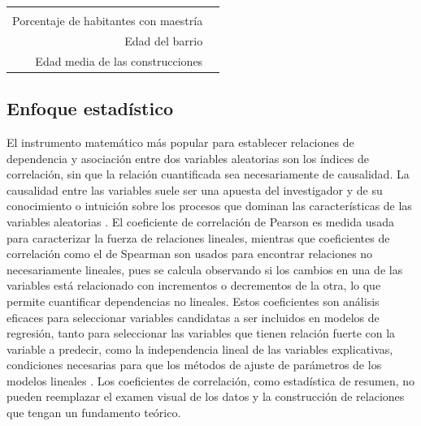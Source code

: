 \documentclass[12pt,]{book}
\begin{document}
\begin{longtable}[]{@{}rr@{}}
\begin{minipage}[t]{0.31\columnwidth}
\end{minipage}\tabularnewline
\begin{minipage}[t]{0.57\columnwidth}\raggedleft\strut
Porcentaje de habitantes con maestría\strut
\end{minipage} & \begin{minipage}[t]{0.31\columnwidth}\raggedleft\strut
\citep{nesbitt_exploring_2016}\strut
\end{minipage}\tabularnewline
\begin{minipage}[t]{0.57\columnwidth}\raggedleft\strut
Edad del barrio\strut
\end{minipage} & \begin{minipage}[t]{0.31\columnwidth}\raggedleft\strut
\strut
\end{minipage}\tabularnewline
\begin{minipage}[t]{0.57\columnwidth}\raggedleft\strut
Edad media de las construcciones\strut
\end{minipage} & \begin{minipage}[t]{0.31\columnwidth}\raggedleft\strut
\citep{zhou_social_2013}\strut
\end{minipage}\tabularnewline
\bottomrule
\end{longtable}

\subsection{Enfoque estadístico}\label{enfoque-estadistico}

El instrumento matemático más popular para establecer relaciones de
dependencia y asociación entre dos variables aleatorias son los índices
de correlación, sin que la relación cuantificada sea necesariamente de
causalidad. La causalidad entre las variables suele ser una apuesta del
investigador y de su conocimiento o intuición sobre los procesos que
dominan las características de las variables aleatorias
\citep{gibbons_mostly_2012}. El coeficiente de correlación de Pearson es
medida usada para caracterizar la fuerza de relaciones lineales,
mientras que coeficientes de correlación como el de Spearman son usados
para encontrar relaciones no necesariamente lineales, pues se calcula
observando si los cambios en una de las variables está relacionado con
incrementos o decrementos de la otra, lo que permite cuantificar
dependencias no lineales. Estos coeficientes son análisis eficaces para
seleccionar variables candidatas a ser incluidos en modelos de
regresión, tanto para seleccionar las variables que tienen relación
fuerte con la variable a predecir, como la independencia lineal de las
variables explicativas, condiciones necesarias para que los métodos de
ajuste de parámetros de los modelos lineales
\citep{gibbons_mostly_2012}. Los coeficientes de correlación, como
estadística de resumen, no pueden reemplazar el examen visual de los
datos y la construcción de relaciones que tengan un fundamento teórico.
\end{document}
